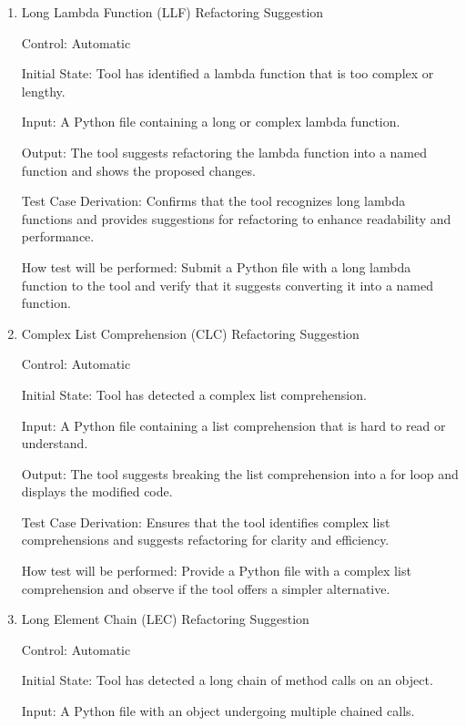 \documentclass[12pt, titlepage]{article}
\begin{document}
\begin{enumerate}
  \item{Long Lambda Function (LLF) Refactoring Suggestion\\}
  
  Control: Automatic
            
  Initial State: Tool has identified a lambda function that is too complex or lengthy.
            
  Input: A Python file containing a long or complex lambda function.
            
  Output: The tool suggests refactoring the lambda function into a named function and shows the proposed changes.
  
  Test Case Derivation: Confirms that the tool recognizes long lambda functions and provides suggestions for refactoring to enhance readability and performance.
            
  How test will be performed: Submit a Python file with a long lambda function to the tool and verify that it suggests converting it into a named function.
  
  \item{Complex List Comprehension (CLC) Refactoring Suggestion\\}
  
  Control: Automatic
            
  Initial State: Tool has detected a complex list comprehension.
            
  Input: A Python file containing a list comprehension that is hard to read or understand.
            
  Output: The tool suggests breaking the list comprehension into a for loop and displays the modified code.
  
  Test Case Derivation: Ensures that the tool identifies complex list comprehensions and suggests refactoring for clarity and efficiency.
            
  How test will be performed: Provide a Python file with a complex list comprehension and observe if the tool offers a simpler alternative.
  
  \item{Long Element Chain (LEC) Refactoring Suggestion\\}
  
  Control: Automatic
            
  Initial State: Tool has detected a long chain of method calls on an object.
            
  Input: A Python file with an object undergoing multiple chained calls.
            

\end{enumerate}
\end{document}
